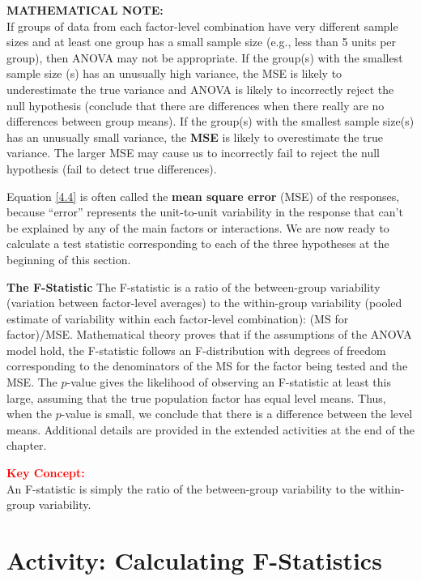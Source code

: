 \documentclass[
]{report}
\begin{document}
\large

\textbf{MATHEMATICAL NOTE:}\\
If groups of data from each factor-level combination have very different sample sizes and at least one group has a small sample size (e.g., less than 5 units per group), then ANOVA may not be appropriate. If the group(s) with the smallest sample size (s) has an unusually high variance, the MSE is likely to underestimate the true variance and ANOVA is likely to incorrectly reject the null hypothesis (conclude that there are differences when there really are no differences between group means). If the group(s) with the smallest sample size(s) has an unusually small variance, the \textbf{MSE} is likely to overestimate the true variance. The larger MSE may cause us to incorrectly fail to reject the null hypothesis (fail to detect true differences).
\normalsize

Equation \ref{4.4} is often called the \textbf{mean square error} (MSE) of the responses, because ``error'' represents the unit-to-unit variability in the response that can't be explained by any of the main factors or interactions. We are now ready to calculate a test statistic corresponding to each of the three hypotheses at the beginning of this section.

\textbf{The F-Statistic} The F-statistic is a ratio of the between-group variability (variation between factor-level averages) to the within-group variability (pooled estimate of variability within each factor-level combination): (MS for factor)/MSE. Mathematical theory proves that if the assumptions of the ANOVA model hold, the F-statistic follows an F-distribution with degrees of freedom corresponding to the denominators of the MS for the factor being tested and the MSE. The \(p\)-value gives the likelihood of observing an F-statistic at least this large, assuming that the true population factor has equal level means. Thus, when the \(p\)-value is small, we conclude that there is a difference between the level means. Additional details are provided in the extended activities at the end of the chapter.

\large

\textbf{\textcolor{red}{Key Concept:}}\\
\color{red}
An F-statistic is simply the ratio of the between-group variability to the within-group variability.
\color{black}
\normalsize

\hypertarget{activity-calculating-f-statistics}{%
\section*{Activity: Calculating F-Statistics}\label{activity-calculating-f-statistics}}
\end{document}

